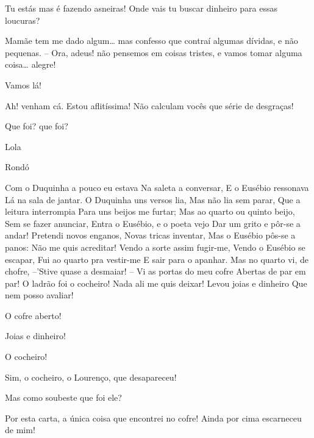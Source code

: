  Tu estás mas é fazendo asneiras! Onde vais tu buscar dinheiro
para essas loucuras?

 Mamãe tem me dado algum\ldots{} mas confesso que contraí algumas 
dívidas, e não pequenas. -- Ora, adeus! não pensemos em coisas tristes, e
vamos tomar alguma coisa\ldots{} alegre!

 Vamos lá!



 Ah! venham cá. Estou aflitíssima! Não calculam vocês que série de
desgraças!

 Que foi? que foi?

 Lola

 Rondó

 Com o Duquinha a pouco eu estava 
 Na saleta a conversar, 
 E o Eusébio ressonava 
 Lá na sala de jantar. 
 O Duquinha uns versos lia, 
 Mas não lia sem parar, 
 Que a leitura interrompia 
 Para uns beijos me furtar; 
 Mas ao quarto ou quinto beijo, 
 Sem se fazer anunciar, 
 Entra o Eusébio, e o poeta vejo 
 Dar um grito e pôr-se a andar! 
 Pretendi novos enganos, 
 Novas tricas inventar, 
 Mas o Eusébio pôs-se a panos: 
 Não me quis acreditar! 
 Vendo a sorte assim fugir-me, 
 Vendo o Eusébio se escapar, 
 Fui ao quarto pra vestir-me 
 E sair para o apanhar. 
 Mas no quarto vi, de chofre, 
 --’Stive quase a desmaiar! -- 
 Vi as portas do meu cofre 
 Abertas de par em par! 
 O ladrão foi o cocheiro! 
 Nada ali me quis deixar! 
 Levou joias e dinheiro 
 Que nem posso avaliar!

 O cofre aberto!

 Joias e dinheiro!

 O cocheiro!

 Sim, o cocheiro, o Lourenço, que desapareceu!

 Mas como soubeste que foi ele?

 Por esta carta, a única coisa que encontrei no cofre! Ainda por cima 
escarneceu de mim! 

